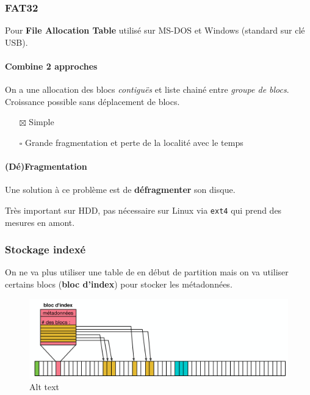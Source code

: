 \subsubsection{FAT32}\label{fat32}

Pour \textbf{File Allocation Table} utilisé sur MS-DOS et Windows
(standard sur clé USB).

\paragraph{Combine 2 approches}\label{combine-2-approches}

On a une allocation des blocs \emph{contiguës} et liste chainé entre
\emph{groupe de blocs}. Croissance possible sans déplacement de blocs.

\begin{itemize}
\tightlist
\item[$\boxtimes$]
  Simple
\item[$\square$]
  Grande fragmentation et perte de la localité avec le temps
\end{itemize}

\paragraph{(Dé)Fragmentation}\label{duxe9fragmentation}

Une solution à ce problème est de \textbf{défragmenter} son disque.

Très important sur HDD, pas nécessaire sur Linux via \texttt{ext4} qui
prend des mesures en amont.

\subsubsection{Stockage indexé}\label{stockage-indexuxe9}

On ne va plus utiliser une table de en début de partition mais on va
utiliser certains blocs (\textbf{bloc d'index}) pour stocker les
métadonnées.

\begin{figure}
\centering
\includegraphics{image-43.png}
\caption{Alt text}
\end{figure}

